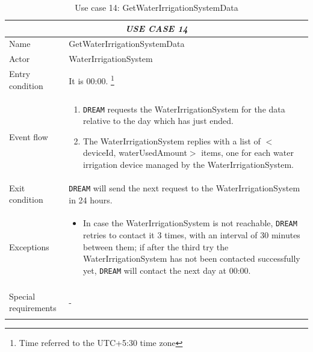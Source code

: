 \documentclass{article}
\begin{document}
\centering
\begin{longtable}{|p{3.5cm}|m{8cm}|}
\caption{Use case 14: GetWaterIrrigationSystemData}
 \label{uc14}
 \hline
 \multicolumn{2}{|c|}{\cellcolor{white}\emph{USE CASE 14}} \\
 \endfirsthead
 \endhead
 \endfoot
 \endlastfoot
 \hline
 Name & GetWaterIrrigationSystemData\\
 \hline
 Actor & WaterIrrigationSystem\\
 \hline
 Entry condition & It is 00:00. \footnote{Time referred to the UTC+5:30 time zone}\\
 \hline
 Event flow & \begin{enumerate}
    \item \verb|DREAM| requests the WaterIrrigationSystem for the data relative to the day which has just ended.
    \item The WaterIrrigationSystem replies with a list of $<$deviceId, waterUsedAmount$>$ items, one for each water irrigation device managed by the WaterIrrigationSystem.
 \end{enumerate}\\
 \hline
 Exit condition & \verb|DREAM| will send the next request to the WaterIrrigationSystem in 24 hours.\\
 \hline
 Exceptions & \begin{itemize}
     \item In case the WaterIrrigationSystem is not reachable, \verb|DREAM| retries to contact it 3 times, with an interval of 30 minutes between them; if after the third try the WaterIrrigationSystem has not been contacted successfully yet, \verb|DREAM| will contact the next day at 00:00.
 \end{itemize}\\
 \hline
 Special requirements &\begin{itemize}
     -
 \end{itemize}\\
 \hline
\end{longtable}
\end{document}
